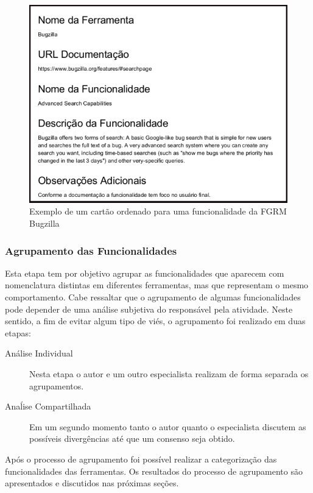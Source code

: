 \begin{figure}[htpb]
	\centering
	\includegraphics[width=0.9\linewidth]{./chapter-estudo-funcionalidades-fgrm/img/exemplo_cartao_ordenado.png}
	\caption{Exemplo de um cartão ordenado para uma funcionalidade da FGRM
		Bugzilla}
\label{fig:exemplo_cartao_ordenado}
\end{figure}

\subsubsection{Agrupamento das Funcionalidades}
\label{subsec:agrupamento_fucionalidades}

Esta etapa tem por objetivo agrupar as funcionalidades que aparecem com
nomenclatura distintas em diferentes ferramentas, mas que representam o mesmo
comportamento. Cabe ressaltar que o agrupamento de algumas funcionalidades pode
depender de uma análise subjetiva do responsável pela atividade. Neste sentido,
a fim de evitar algum tipo de viés, o agrupamento foi realizado em duas etapas:

\begin{description}
	\item[Análise Individual] Nesta etapa o autor e um outro especialista
		realizam de forma separada os agrupamentos.
	\item[Anaĺise Compartilhada] Em um segundo momento tanto o autor quanto o
		es\-pe\-ci\-a\-lis\-ta discutem as possíveis divergências até que um
		consenso seja obtido.
\end{description}

Após o processo de agrupamento foi possível realizar a categorização das
funcionalidades das ferramentas. Os resultados do processo de agrupamento são
apresentados e discutidos nas próximas seções.

